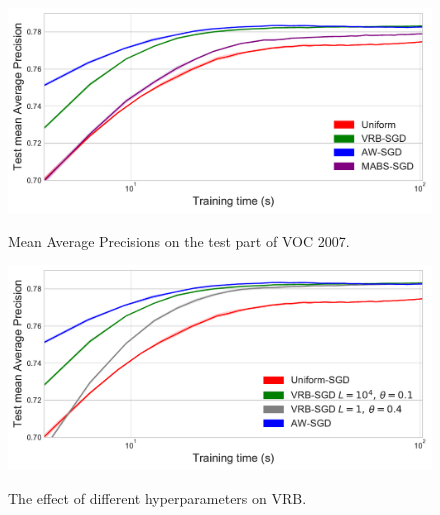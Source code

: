 \begin{figure}[h]
\centering
\begin{minipage}{.48\textwidth}
  \centering
  \includegraphics[width=\linewidth]{figures/voc-result.pdf}
      \caption{Mean Average Precisions on the test part of VOC 2007.}
      \label{fig:voc-results}
\end{minipage}%
\quad
\begin{minipage}{.48\textwidth}
  \centering
  \includegraphics[width=\linewidth]{figures/voc-result-2.pdf}
      \caption{The effect of different hyperparameters on VRB. }
      \label{fig:voc-results-2}
\label{fig:test}
\end{minipage}%
\end{figure}

